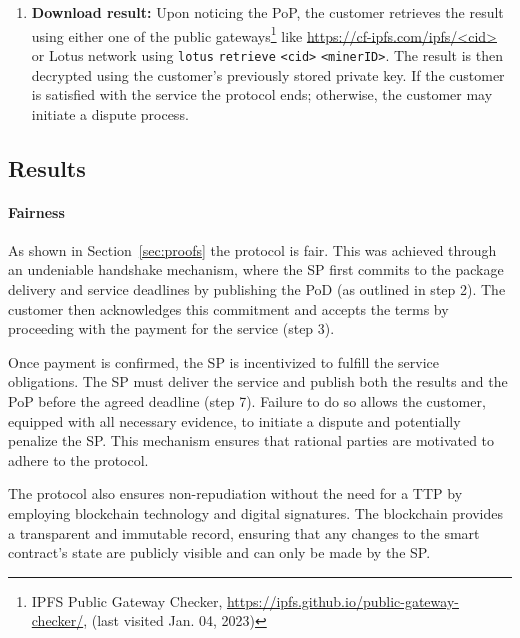 \documentclass[pdftex,twocolumn,epjc3]{svjour3}
\begin{document}
\begin{enumerate}
  \item \textbf{Download result:} Upon noticing the PoP, the customer retrieves the result using either one of the public gateways\footnote{IPFS Public Gateway Checker, \url{https://ipfs.github.io/public-gateway-checker/}, (last visited Jan. 04, 2023)} like \url{https://cf-ipfs.com/ipfs/<cid>} or Lotus network using \texttt{lotus} \texttt{retrieve} \texttt{<cid>} \texttt{<minerID>}. The result is then decrypted using the customer's previously stored private key. If the customer is satisfied with the service the protocol ends; otherwise, the customer may initiate a dispute process.

\end{enumerate}

\subsection{Results}

\paragraph{Fairness}
As shown in Section~\ref{sec:proofs} the protocol is fair. This was achieved through an undeniable handshake mechanism, where the SP first commits to the package delivery and service deadlines by publishing the PoD (as outlined in step 2). The customer then acknowledges this commitment and accepts the terms by proceeding with the payment for the service (step 3).

Once payment is confirmed, the SP is incentivized to fulfill the service obligations. The SP must deliver the service and publish both the results and the PoP before the agreed deadline (step 7). Failure to do so allows the customer, equipped with all necessary evidence, to initiate a dispute and potentially penalize the SP. This mechanism ensures that rational parties are motivated to adhere to the protocol.

The protocol also ensures non-repudiation without the need for a TTP by employing blockchain technology and digital signatures. The blockchain provides a transparent and immutable record, ensuring that any changes to the smart contract's state are publicly visible and can only be made by the SP.
\end{document}
